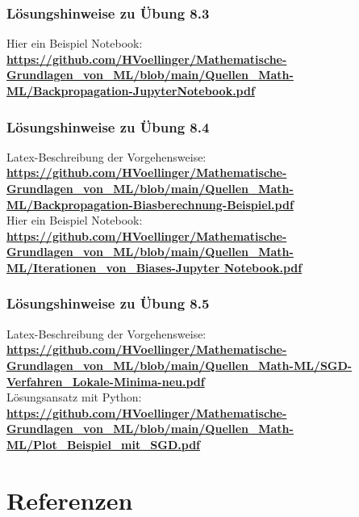 \documentclass[12pt]{article}
\begin{document}
\subsubsection{Lösungshinweise zu Übung 8.3}
Hier ein Beispiel Notebook:\\
\textbf{\url{https://github.com/HVoellinger/Mathematische-Grundlagen_von_ML/blob/main/Quellen_Math-ML/Backpropagation-JupyterNotebook.pdf}}  

\subsubsection{Lösungshinweise zu Übung 8.4}

Latex-Beschreibung der Vorgehensweise: \\
\textbf{\url{https://github.com/HVoellinger/Mathematische-Grundlagen_von_ML/blob/main/Quellen_Math-ML/Backpropagation-Biasberechnung-Beispiel.pdf}} \\[0.4cm]
%
Hier ein Beispiel Notebook:\\
\textbf{\url{https://github.com/HVoellinger/Mathematische-Grundlagen_von_ML/blob/main/Quellen_Math-ML/Iterationen_von_Biases-Jupyter Notebook.pdf}}  

\subsubsection{Lösungshinweise zu Übung 8.5}
Latex-Beschreibung der Vorgehensweise: \\
\textbf{\url{https://github.com/HVoellinger/Mathematische-Grundlagen_von_ML/blob/main/Quellen_Math-ML/SGD-Verfahren_Lokale-Minima-neu.pdf}} \\[0.2cm]
Lösungsansatz mit Python: \\[0.1cm]
\textbf{\url{https://github.com/HVoellinger/Mathematische-Grundlagen_von_ML/blob/main/Quellen_Math-ML/Plot_Beispiel_mit_SGD.pdf}} 

\newpage

 \section{Referenzen}
\end{document}
